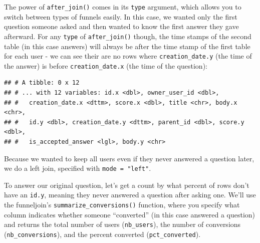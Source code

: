 \documentclass[]{article}
\newenvironment{Shaded}{\begin{snugshade}}{\end{snugshade}}
\newcommand{\KeywordTok}[1]{\textcolor[rgb]{0.13,0.29,0.53}{\textbf{#1}}}
\newcommand{\DataTypeTok}[1]{\textcolor[rgb]{0.13,0.29,0.53}{#1}}
\newcommand{\StringTok}[1]{\textcolor[rgb]{0.31,0.60,0.02}{#1}}
\newcommand{\OperatorTok}[1]{\textcolor[rgb]{0.81,0.36,0.00}{\textbf{#1}}}
\newcommand{\NormalTok}[1]{#1}
\begin{document}
The power of \texttt{after\_join()} comes in its \texttt{type} argument,
which allows you to switch between types of funnels easily. In this
case, we wanted only the first question someone asked and then wanted to
know the first answer they gave afterward. For any \texttt{type} of
\texttt{after\_join()} though, the time stamps of the second table (in
this case answers) will always be after the time stamp of the first
table for each user - we can see their are no rows where
\texttt{creation\_date.y} (the time of the answer) is before
\texttt{creation\_date.x} (the time of the question):

\begin{Shaded}
\end{Shaded}

\begin{verbatim}
## # A tibble: 0 x 12
## # ... with 12 variables: id.x <dbl>, owner_user_id <dbl>,
## #   creation_date.x <dttm>, score.x <dbl>, title <chr>, body.x <chr>,
## #   id.y <dbl>, creation_date.y <dttm>, parent_id <dbl>, score.y <dbl>,
## #   is_accepted_answer <lgl>, body.y <chr>
\end{verbatim}

Because we wanted to keep all users even if they never answered a
question later, we do a left join, specified with
\texttt{mode\ =\ "left"}.

To answer our original question, let's get a count by what percent of
rows don't have an \texttt{id.y}, meaning they never answered a question
after asking one. We'll use the funneljoin's
\texttt{summarize\_conversions()} function, where you specify what
column indicates whether someone ``converted'' (in this case answered a
question) and returns the total number of users (\texttt{nb\_users}),
the number of conversions (\texttt{nb\_conversions}), and the percent
converted (\texttt{pct\_converted}).

\begin{Shaded}
\end{Shaded}
\end{document}
